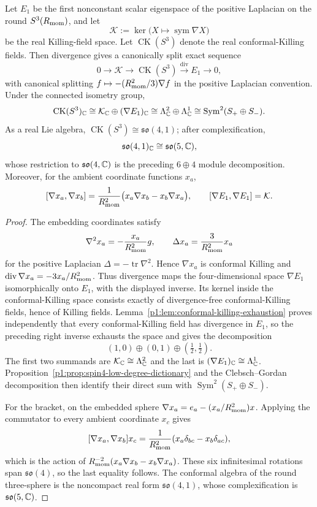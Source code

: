 \documentclass[11pt]{article}
\begin{document}
\begin{theorem}
\label{p1:thm:quadratic-shell-conformal-killing}
Let \(E_1\) be the first nonconstant scalar eigenspace of the positive
Laplacian on the round \(S^3(R_{\mathrm{mom}})\), and let
\[
 \mathcal K:=\ker\bigl(X\mapsto\operatorname{sym}\nabla X\bigr)
\]
be the real Killing-field space.  Let \(\operatorname{CK}(S^3)\) denote the
real conformal-Killing fields.  Then divergence gives a canonically split
exact sequence
\[
 0\longrightarrow\mathcal K
 \longrightarrow\operatorname{CK}(S^3)
 \overset{\operatorname{div}}{\longrightarrow}E_1
 \longrightarrow0,
\]
with canonical splitting \(f\mapsto-(R_{\mathrm{mom}}^2/3)\nabla f\) in the positive
Laplacian convention.  Under the connected isometry group,
\[
 \operatorname{CK}(S^3)_{\mathbb{C}}
 \cong
 \mathcal K_{\mathbb{C}}\oplus(\nabla E_1)_{\mathbb{C}}
 \cong
 \Lambda^2_{\mathbb{C}}\oplus\Lambda^1_{\mathbb{C}}
 \cong
 \operatorname{Sym}^2(S_+\oplus S_-).
\]
As a real Lie algebra,
\(\operatorname{CK}(S^3)\cong\mathfrak{so}(4,1)\); after complexification,
\[
 \mathfrak{so}(4,1)_{\mathbb{C}}\cong\mathfrak{so}(5,\mathbb{C}),
\]
whose restriction to \(\mathfrak{so}(4,\mathbb{C})\) is the preceding
\(6\oplus4\) module decomposition.  Moreover, for the ambient coordinate
functions \(x_a\),
\[
 [\nabla x_a,\nabla x_b]
 =\frac1{R_{\mathrm{mom}}^2}\bigl(x_a\nabla x_b-x_b\nabla x_a\bigr),
 \qquad
 [\nabla E_1,\nabla E_1]=\mathcal K.
\]
\end{theorem}

\begin{proof}
The embedding coordinates satisfy
\[
 \nabla^2x_a=-\frac{x_a}{R_{\mathrm{mom}}^2}g,
 \qquad
 \Delta x_a=\frac{3}{R_{\mathrm{mom}}^2}x_a
\]
for the positive Laplacian \(\Delta=-\operatorname{tr}\nabla^2\).  Hence
\(\nabla x_a\) is conformal Killing and
\(\operatorname{div}\nabla x_a=-3x_a/R_{\mathrm{mom}}^2\).  Thus divergence maps the
four-dimensional space \(\nabla E_1\) isomorphically onto \(E_1\), with the
displayed inverse.  Its kernel inside the conformal-Killing space consists
exactly of divergence-free conformal-Killing fields, hence of Killing fields.
Lemma~\ref{p1:lem:conformal-killing-exhaustion} proves independently
that every conformal-Killing field has divergence in \(E_1\), so the
preceding right inverse exhausts the space and gives the decomposition
\[
 (1,0)\oplus(0,1)\oplus(\tfrac12,\tfrac12).
\]
The first two summands are
\(\mathcal K_{\mathbb{C}}\cong\Lambda^2_{\mathbb{C}}\) and the last is
\((\nabla E_1)_{\mathbb{C}}\cong\Lambda^1_{\mathbb{C}}\).  Proposition~\ref{p1:prop:spin4-low-degree-dictionary}
and the Clebsch--Gordan decomposition then identify their direct sum with
\(\operatorname{Sym}^2(S_+\oplus S_-)\).

For the bracket, on the embedded sphere
\(\nabla x_a=e_a-(x_a/R_{\mathrm{mom}}^2)x\).  Applying the commutator to every ambient
coordinate \(x_c\) gives
\[
 [\nabla x_a,\nabla x_b]x_c
 =\frac1{R_{\mathrm{mom}}^2}(x_a\delta_{bc}-x_b\delta_{ac}),
\]
which is the action of
\(R_{\mathrm{mom}}^{-2}(x_a\nabla x_b-x_b\nabla x_a)\).  These six infinitesimal
rotations span \(\mathfrak{so}(4)\), so the last equality follows.  The
conformal algebra of the round three-sphere is the noncompact real form
\(\mathfrak{so}(4,1)\), whose complexification is \(\mathfrak{so}(5,\mathbb{C})\).
\end{proof}
\end{document}
